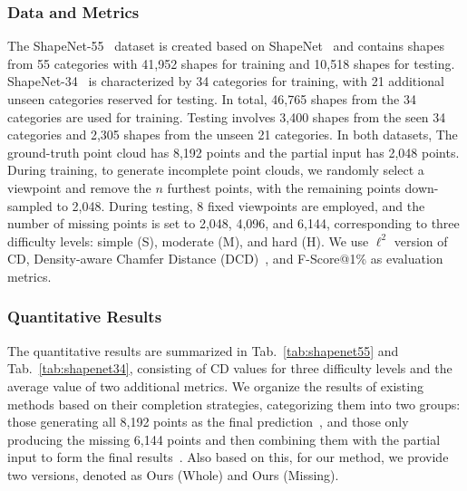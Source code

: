 \subsubsection{Data and Metrics}
The ShapeNet-55~\citep{yu2021pointr} dataset is created based on ShapeNet~\citep{chang2015shapenet} and contains shapes from 55 categories with 41,952 shapes for training and 10,518 shapes for testing. 
ShapeNet-34~\citep{yu2021pointr} is characterized by 34 categories for training, with 21 additional unseen categories reserved for testing. In total, 46,765 shapes from the 34 categories are used for training. Testing involves 3,400 shapes from the seen 34 categories and 2,305 shapes from the unseen 21 categories.
In both datasets, The ground-truth point cloud has 8,192 points and the partial input has 2,048 points. 
During training, to generate incomplete point clouds, we randomly select a viewpoint and remove the $n$ furthest points, with the remaining points down-sampled to 2,048. During testing, 8 fixed viewpoints are employed, and the number of missing points is set to 2,048, 4,096, and 6,144, corresponding to three difficulty levels: simple (S), moderate (M), and hard (H).
We use $\displaystyle \ell^{2}$ version of CD, Density-aware Chamfer Distance (DCD)~\citep{wu2021balanced}, and F-Score@1\% as evaluation metrics.

\subsubsection{Quantitative Results}
The quantitative results are summarized in Tab.~\ref{tab:shapenet55} and Tab.~\ref{tab:shapenet34}, consisting of CD values for three difficulty levels and the average value of two additional metrics. We organize the results of existing methods based on their completion strategies, categorizing them into two groups: those generating all 8,192 points as the final prediction~\citep{yang2018foldingnet,yuan2018pcn,tchapmi2019topnet,xie2020grnet,9928787,zhou2022seedformer,10232862,Zhu_2023_ICCV,DBLP:journals/ijcv/ZhangLXNZTL23}, and those only producing the missing 6,144 points and then combining them with the partial input to form the final results~\citep{huang2020pf,yu2021pointr,li2023proxyformer,chen2023anchorformer}. Also based on this, for our method, we provide two versions, denoted as Ours (Whole) and Ours (Missing).

